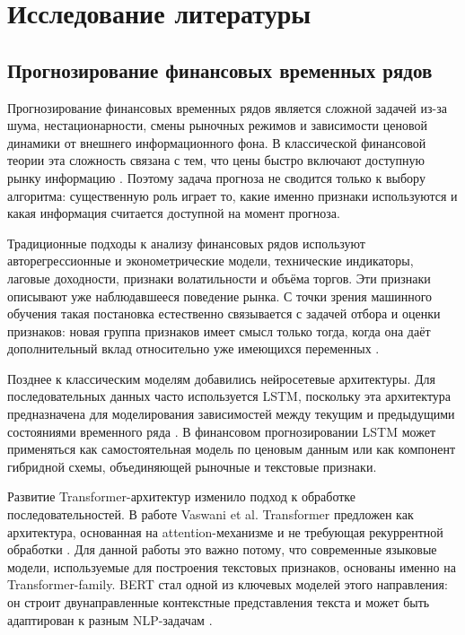 \section{Исследование литературы}

\subsection{Прогнозирование финансовых временных рядов}

Прогнозирование финансовых временных рядов является сложной задачей из-за шума, нестационарности, смены рыночных режимов и зависимости ценовой динамики от внешнего информационного фона. В классической финансовой теории эта сложность связана с тем, что цены быстро включают доступную рынку информацию \cite{fama1970efficient}. Поэтому задача прогноза не сводится только к выбору алгоритма: существенную роль играет то, какие именно признаки используются и какая информация считается доступной на момент прогноза.

Традиционные подходы к анализу финансовых рядов используют авторегрессионные и эконометрические модели, технические индикаторы, лаговые доходности, признаки волатильности и объёма торгов. Эти признаки описывают уже наблюдавшееся поведение рынка. С точки зрения машинного обучения такая постановка естественно связывается с задачей отбора и оценки признаков: новая группа признаков имеет смысл только тогда, когда она даёт дополнительный вклад относительно уже имеющихся переменных \cite{guyon2003feature}.

Позднее к классическим моделям добавились нейросетевые архитектуры. Для последовательных данных часто используется LSTM, поскольку эта архитектура предназначена для моделирования зависимостей между текущим и предыдущими состояниями временного ряда \cite{hochreiter1997lstm}. В финансовом прогнозировании LSTM может применяться как самостоятельная модель по ценовым данным или как компонент гибридной схемы, объединяющей рыночные и текстовые признаки.

Развитие Transformer-архитектур изменило подход к обработке последовательностей. В работе Vaswani et al. Transformer предложен как архитектура, основанная на attention-механизме и не требующая рекуррентной обработки \cite{vaswani2017attention}. Для данной работы это важно потому, что современные языковые модели, используемые для построения текстовых признаков, основаны именно на Transformer-family. BERT стал одной из ключевых моделей этого направления: он строит двунаправленные контекстные представления текста и может быть адаптирован к разным NLP-задачам \cite{devlin2019bert}.

